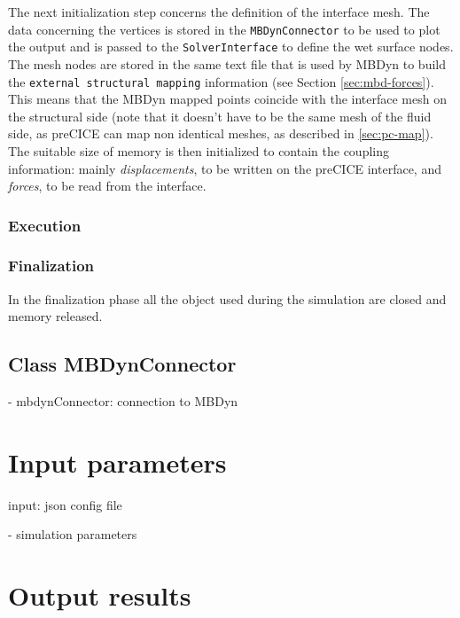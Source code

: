 The next initialization step concerns the definition of the interface mesh. The data concerning the vertices is stored in the \texttt{MBDynConnector} to be used to plot the output and is passed to the \texttt{SolverInterface} to define the wet surface nodes. The mesh nodes are stored in the same text file that is used by MBDyn to build the \texttt{external structural mapping} information (see Section \ref{sec:mbd-forces}). This means that the MBDyn mapped points coincide with the interface mesh on the structural side (note that it doesn't have to be the same mesh of the fluid side, as preCICE can map non identical meshes, as described in \ref{sec:pc-map}). The suitable size of memory is then initialized to contain the coupling information: mainly \textit{displacements}, to be written on the preCICE interface, and \textit{forces}, to be read from the interface.


\subsubsection{Execution}




\subsubsection{Finalization}

In the finalization phase all the object used during the simulation are closed and memory released.



\subsection{Class MBDynConnector}
\label{sec:mbdyn-connector.h}

- mbdynConnector: connection to MBDyn



\section{Input parameters}
\label{sec:mbdyn-adapter-input}

input: json config file

- simulation parameters

\section{Output results}

